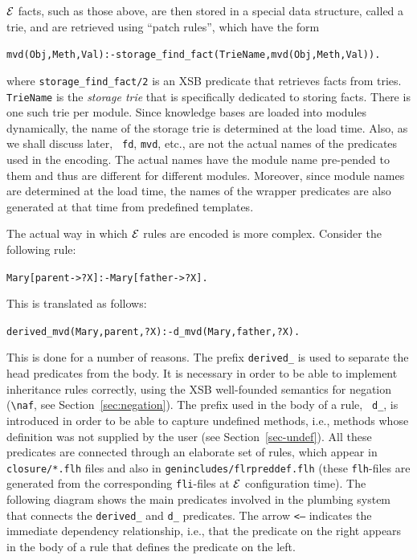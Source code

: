 \documentclass[11pt]{article}
\newcommand{\ERGO}{\mbox{\ensuremath{\cal{E}}\smaller{{\sc{RGO}}}}\xspace}
\newcommand{\FLSYSTEM}{\ERGO}
\newcommand{\bs}{\textbackslash}
\newcommand{\RULELOGNAF}{{\texttt{{\bs}naf}}\xspace}
\begin{document}
\FLSYSTEM facts, such as those above, are then stored in a special data structure,
called a {\rm trie}, and are retrieved using  ``patch rules'', which have the
form
\begin{alltt}
   mvd(Obj,Meth,Val) :- storage\_find\_fact(TrieName, mvd(Obj,Meth,Val)).  
\end{alltt}
where {\tt storage\_find\_fact/2} is an XSB predicate that retrieves facts
from tries. {\tt TrieName} is the \emph{storage trie} that is specifically
dedicated to storing facts. There is one such trie per module. Since
knowledge bases are loaded into modules dynamically, the name of the storage trie
is determined at the load time. Also, as we shall discuss later, {\tt
  fd}, {\tt mvd}, etc., are not the actual names of the predicates used in
the encoding. The actual names have the module name pre-pended to them and
thus are different for different modules. Moreover, since module names are
determined at the load time, the names of the wrapper predicates are
also generated at that time from predefined templates.

The actual way in which \FLSYSTEM rules are encoded is more complex. Consider the following rule:
\begin{alltt}
    Mary[parent->?X] :- Mary[father->?X].  
\end{alltt}
This is translated as follows:
\begin{alltt}
    derived\_mvd(Mary,parent,?X) :- d\_mvd(Mary,father,?X).  
\end{alltt}
This is done for a number of reasons. The prefix {\tt derived\_} is used to
separate the head predicates from the body. It is necessary in order to
be able to implement inheritance rules correctly, using the XSB
well-founded semantics for negation (\RULELOGNAF, see
Section~\ref{sec:negation}). The prefix used in the body of a rule, {\tt
  d\_}, is introduced in order to be able to capture undefined methods,
i.e., methods whose definition was not supplied by the user (see
Section~\ref{sec-undef}). All these predicates are connected through an
elaborate set of rules, which appear in {\tt closure/*.flh} files and also
in {\tt genincludes/flrpreddef.flh} (these {\tt flh}-files are generated
from the corresponding {\tt fli}-files at \FLSYSTEM configuration time).
The following diagram shows the main
predicates involved in the plumbing system that connects
the {\tt derived\_} and {\tt d\_} predicates. The arrow {\tt <---} indicates the
immediate dependency relationship, i.e., that the predicate on the
right appears in the body of a rule that defines the predicate on the left.
\end{document}
